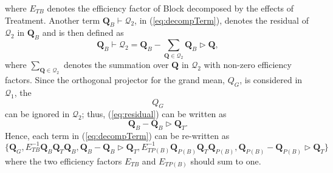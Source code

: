 \documentclass[11pt,a4paper]{article}
\newcommand{\Q}{\mathbf{Q}}
\begin{document}
where $E_{TB}$ denotes the efficiency factor of Block decomposed by the effects of Treatment. Another term $\Q_{B} \vdash \mathcal{Q}_2$, in (\ref{eq:decompTerm}), denotes the residual of $\mathcal{Q}_2$ in $\Q_{B}$ and is then defined as
\begin{equation}\label{eq:residual}
\Q_{B} \vdash \mathcal{Q}_2 = \Q_{B} - \sum_{\Q \in \mathcal{Q}_2} \Q_{B} \rhd \Q,
\end{equation}
where $\sum_{\Q \in \mathcal{Q}_2}$ denotes the summation over $\Q$ in $\mathcal{Q}_2$ with non-zero efficiency factors. Since the orthogonal projector for the grand mean, $Q_G$, is considered in $\mathcal{Q}_1$, the $$Q_G$$ can be ignored in $\mathcal{Q}_2$; thus, (\ref{eq:residual}) can be written as 
\[\Q_{B} - \Q_{B} \rhd \Q_{T}.\] 
Hence, each term in (\ref{eq:decompTerm}) can be re-written as 
\begin{equation}\label{eq:decompTermExpaned}
\{\Q_{G}, E_{TB}^{-1}\Q_{B}\Q_{T}\Q_{B}, \Q_{B} - \Q_{B}  \rhd \Q_{T}, E_{T P(B)}^{-1}\Q_{P(B)}\Q_{T}\Q_{P(B)}, \Q_{P(B)} -\Q_{P(B)} \rhd \Q_{T}\}
\end{equation}
where the two efficiency factors $E_{T B}$ and $E_{T P(B)}$ should sum to one. 
\end{document}
